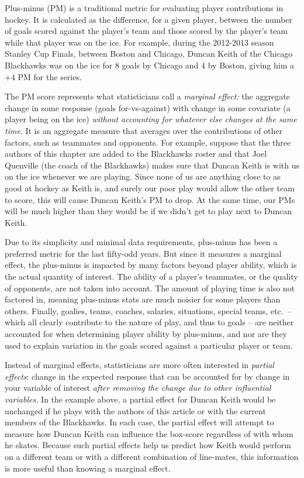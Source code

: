Plus-minus (PM) is a traditional metric for evaluating player contributions in
hockey. It is calculated as the difference, for a given player, between the
number of goals scored against the player's team and those scored by the
player's team while that player was on the ice.  For example, during the
2012-2013 season Stanley Cup Finals, between Boston and Chicago, Duncan Keith
of the Chicago Blackhawks was on the ice for 8 goals by Chicago and 4 by
Boston, giving him a +4 PM for the series.

The PM score represents what statisticians call a \textit{marginal effect:}
the aggregate change in some response (goals for-vs-against) with change in some
covariate (a player being on the ice) \textit{without accounting for whatever
else changes at the same time}. It is an aggregate measure that averages over
the contributions of other factors, such as teammates and opponents.   For
example, suppose that the three authors of this chapter are added to the
Blackhawks roster and that Joel Quenville (the coach of the Blackhawks) makes
sure that Duncan Keith is with us on the ice whenever we are playing.  Since
none of us are anything close to as good at hockey as Keith is, and surely our
poor play would allow the other team to score, this will cause Duncan Keith's
PM to drop.  At the same time, our PMs will be much higher than they would be
if we didn't get to play next to Duncan Keith.

Due to its simplicity and minimal data requirements, plus-minus has been a
preferred metric for the last fifty-odd years.  But since it measures a
marginal effect, the plus-minus is impacted by many factors beyond player
ability, which is the actual quantity of interest.  The ability of a player's
teammates, or the quality of opponents, are not taken into account.  The amount of
playing time is also not factored in, meaning plus-minus stats are much
noisier for some players than others. Finally, goalies, teams, coaches,
salaries, situations, special teams, etc.~-- which all clearly contribute to
the nature of play, and thus to goals -- are neither accounted for when
determining player ability by plus-minus, and nor are they used to explain
variation in the goals scored against a particular player or team.

Instead of marginal effects, statisticians are more often interested in
\textit{partial effects}: change in the expected response that can be
accounted for by change in your variable of interest \textit{after removing
the change due to other influential variables.} In the example above, a
partial effect for Duncan Keith would be unchanged if he plays with the
authors of this article or with the current members of the Blackhawks.  In
each case, the partial effect will attempt to measure how Duncan Keith can
influence the box-score regardless of with whom he skates. Because such partial
effects help us predict how Keith would perform on a different team or with a
different combination of line-mates, this information is more useful than
knowing a marginal effect.

